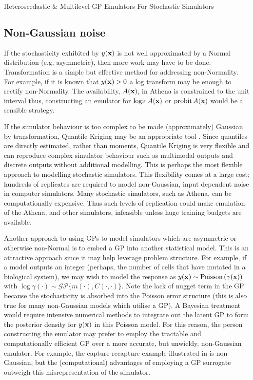 \begin{chapter}{Heteroscedastic \& Multilevel GP Emulators For Stochastic Simulators\label{Ch:Hetsml}}
\subsection{Non-Gaussian noise}
If the stochasticity exhibited by $y(\mathbf{x})$ is not well approximated by a Normal distribution (e.g. asymmetric), then more work may have to be done. Transformation is a simple but effective method for addressing non-Normality. For example, if it is known that $y(\mathbf{x}) > 0$ a log transform may be enough to rectify non-Normality. The availability, $A(\mathbf{x})$, in Athena is constrained to the unit interval thus, constructing an emulator for $\text{logit}\, A(\mathbf{x})$ or $\text{probit}\, A(\mathbf{x})$ would be a sensible strategy.

If the simulator behaviour is too complex to be made (approximately) Gaussian by transformation, Quantile Kriging may be an appropriate tool \citep{Plumlee2014}. Since quantiles are directly estimated, rather than moments, Quantile Kriging is very flexible and can reproduce complex simulator behaviour such as multimodal outputs and discrete outputs without additional modelling. This is perhaps the most flexible approach to modelling stochastic simulators. This flexibility comes at a large cost; hundreds of replicates are required to model non-Gaussian, input dependent noise in computer simulators. Many stochastic simulators, such as Athena, can be computationally expensive. Thus such levels of replication could make emulation of the Athena, and other simulators, infeasible unless huge training budgets are available.

Another approach to using GPs to model simulators which are asymmetric or otherwise non-Normal is to embed a GP into another statistical model. This is an attractive approach since it may help leverage problem structure. For example, if a model outputs an integer (perhaps, the number of cells that have mutated in a biological system), we may wish to model the response as $y(\mathbf{x}) \sim \text{Poisson}\,(\gamma(\mathbf{x}))$ with $\log \gamma (\cdot) \sim \mathcal{GP} \{m(\cdot), C(\cdot, \cdot) \}$. Note the lack of nugget term in the GP because the stochasticity is absorbed into the Poisson error structure (this is also true for many non-Gaussian models which utilise a GP). A Bayesian treatment would require intensive numerical methods to integrate out the latent GP to form the posterior density for $y(\mathbf{x})$ in this Poisson model. For this reason, the person constructing the emulator may prefer to employ the tractable and computationally efficient GP over a more accurate, but unwieldy, non-Gaussian emulator. For example, the capture-recapture example illustrated in \citet{Baker2022} is non-Gaussian, but the (computational) advantages of employing a GP surrogate outweigh this misrepresentation of the simulator.


\end{chapter}
